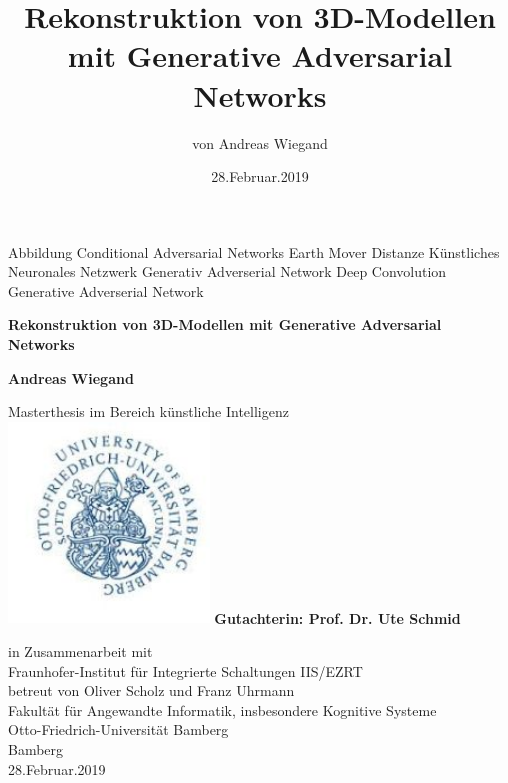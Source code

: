 \documentclass{llncs}
\begin{document}
\tableofcontents
\newpage
\begin{acronym}[Bash]
	 Abbildung
	Conditional Adversarial Networks
	 Earth Mover Distanze
	 Künstliches Neuronales Netzwerk
	 Generativ Adverserial Network
	Deep Convolution Generative Adverserial Network
	\end{acronym}
\begin{titlepage}
	\begin{center}
		\vspace{3cm}
		
		\textbf{\huge Rekonstruktion von 3D-Modellen mit Generative Adversarial Networks}

				
		\vspace{1.5cm}
		
		\textbf{Andreas Wiegand}
		
		
		
		Masterthesis im Bereich künstliche Intelligenz \\
		\vspace{1.5cm}
		\includegraphics[width=0.4\textwidth]{bamberg_logo.png}
		\vspace{1.5cm}
		\textbf{Gutachterin: Prof. Dr. Ute Schmid\\ }

		\vspace{1.5cm}
		in Zusammenarbeit mit\\
		Fraunhofer-Institut für Integrierte Schaltungen IIS/EZRT\\
		betreut von Oliver Scholz und Franz Uhrmann\\
		\vspace{0.8cm}
		Fakultät für Angewandte Informatik, insbesondere Kognitive Systeme\\
		Otto-Friedrich-Universität Bamberg\\
		Bamberg\\
		28.Februar.2019
		
	\end{center}
\end{titlepage}
\title{Rekonstruktion von 3D-Modellen mit Generative Adversarial Networks}
\author{von Andreas Wiegand}
\date{28.Februar.2019}
\maketitle
\end{document}
